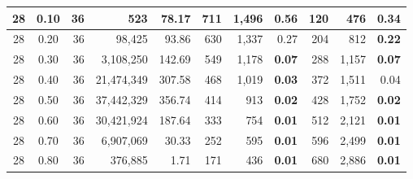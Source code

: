 \begin{table}[H]
\begin{tabular}{|c|c|r|r|r|r|r|r|r|r|r|}
        28                              & 0.10                              & 36                                     & 523                               & 78.17                             & 711           & 1,496            & 0.56          & 120           & 476              & \textbf{0.34} \\ \hline
        28                              & 0.20                              & 36                                     & 98,425                            & 93.86                             & 630           & 1,337            & 0.27          & 204           & 812              & \textbf{0.22} \\ \hline
        28                              & 0.30                              & 36                                     & 3,108,250                         & 142.69                            & 549           & 1,178            & \textbf{0.07} & 288           & 1,157            & \textbf{0.07} \\ \hline
        28                              & 0.40                              & 36                                     & 21,474,349                        & 307.58                            & 468           & 1,019            & \textbf{0.03} & 372           & 1,511            & 0.04          \\ \hline
        28                              & 0.50                              & 36                                     & 37,442,329                        & 356.74                            & 414           & 913              & \textbf{0.02} & 428           & 1,752            & \textbf{0.02} \\ \hline
        28                              & 0.60                              & 36                                     & 30,421,924                        & 187.64                            & 333           & 754              & \textbf{0.01} & 512           & 2,121            & \textbf{0.01} \\ \hline
        28                              & 0.70                              & 36                                     & 6,907,069                         & 30.33                             & 252           & 595              & \textbf{0.01} & 596           & 2,499            & \textbf{0.01} \\ \hline
        28                              & 0.80                              & 36                                     & 376,885                           & 1.71                              & 171           & 436              & \textbf{0.01} & 680           & 2,886            & \textbf{0.01} \\ \hline

\end{tabular}
\end{table}
